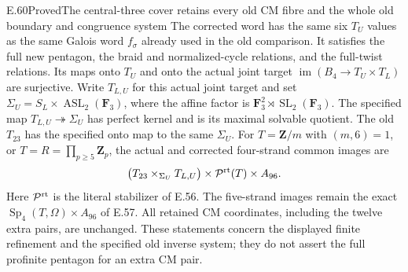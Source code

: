 \begin{statement}{E.60}{Proved}{The central-three cover retains every old CM fibre and the whole old boundary and congruence system}
The corrected word has the same six $T_U$ values as the same
Galois word $f_\sigma$ already used in the old comparison.
It satisfies the full new pentagon, the braid and normalized-cycle
relations, and the full-twist relations. Its maps onto $T_U$
and onto the actual joint target
$\operatorname{im}(B_4\to T_U\times T_L)$ are surjective.
Write $T_{L,U}$ for this actual joint target and set
$\Sigma_U=S_L\times\operatorname{ASL}_2(\mathbf F_3)$,
where the affine factor is
$\mathbf F_3^2\rtimes\operatorname{SL}_2(\mathbf F_3)$.
The specified map $T_{L,U}\twoheadrightarrow\Sigma_U$
has perfect kernel and is its maximal solvable quotient.
The old $T_{23}$ has the specified onto map to the same
$\Sigma_U$. For $T=\mathbf Z/m$ with $(m,6)=1$, or
$T=R=\prod_{p\ge5}\mathbf Z_p$, the actual and corrected
four-strand common images are
\[
  \bigl(T_{23}\times_{\Sigma_U}T_{L,U}\bigr)
                   \times\mathcal P^{\rm rt}(T)\times A_{96}.
\]
Here $\mathcal P^{\rm rt}$ is the literal stabilizer of
E.56. The five-strand images remain the exact
$\operatorname{Sp}_4(T,\Omega)\times A_{96}$ of E.57.
All retained CM coordinates, including the twelve extra pairs,
are unchanged. These statements concern the displayed finite
refinement and the specified old inverse system; they do not
assert the full profinite pentagon for an extra CM pair.
\end{statement}

